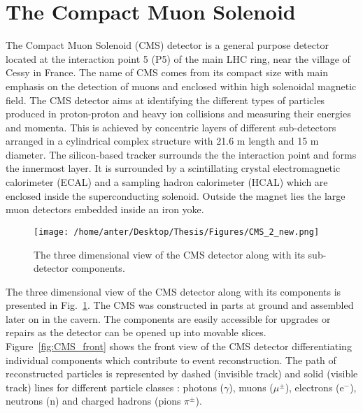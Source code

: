 \section{The Compact Muon Solenoid}
The Compact Muon Solenoid (CMS) detector is a general purpose detector located at the interaction point 5 (P5) of the main LHC ring, near the village of Cessy in France. The name of CMS comes from its compact size with main emphasis on the detection of muons and enclosed within high solenoidal magnetic field. The CMS detector aims at identifying the different types of particles produced in proton-proton and heavy ion collisions and measuring their energies and momenta. This is achieved by concentric layers of different sub-detectors arranged in a cylindrical complex structure with 21.6 m length and 15 m diameter. The silicon-based tracker surrounds the the interaction point and forms the innermost layer. It is surrounded by a scintillating crystal electromagnetic calorimeter (ECAL) and a sampling hadron calorimeter (HCAL) which are enclosed inside the superconducting solenoid. Outside the magnet lies the large muon detectors embedded inside an iron yoke. 
\begin{figure}[!h]
\begin{center}
\vspace{2mm}
\hspace*{-6mm}
\texttt{[image: /home/anter/Desktop/Thesis/Figures/CMS\_2\_new.png]}\\
\vspace*{5mm}
\caption[The three dimensional view of the CMS detector along with its sub-detector components.]{The three dimensional view of the CMS detector along with its sub-detector components\footnotemark.}
\label{fig:CMS}
\end{center}
\end{figure}
The three dimensional view of the CMS detector along with its components is presented in Fig.~\ref{fig:CMS}. The CMS was constructed in parts at ground and assembled later on in the cavern. The components are easily accessible for upgrades or repairs as the detector can be opened up into movable slices. Figure~\ref{fig:CMS_front} shows the front view of the CMS detector differentiating individual components which contribute to event reconstruction. The path of reconstructed particles is represented by dashed (invisible track) and solid (visible track) lines for different particle classes : photons ($\gamma$), muons ($\mu^{\pm}$), electrons (e$^{-}$), neutrons (n) and charged hadrons (pions $\pi^{\pm}$).


